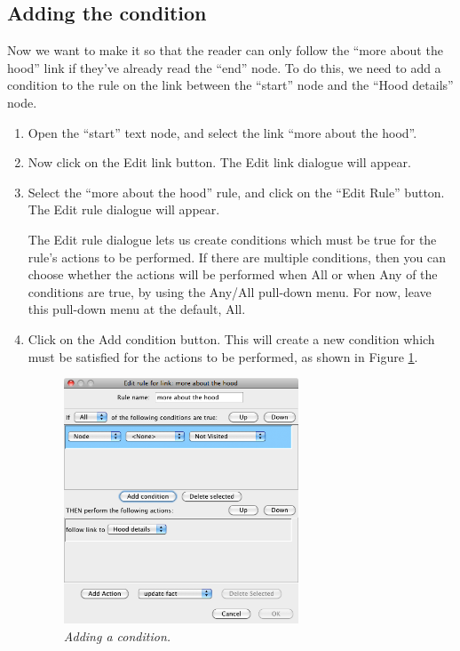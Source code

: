 \documentclass{article}
\begin{document}
\subsection{Adding the condition}

Now we want to make it so that the reader can only follow the ``more about the
hood'' link if they've already read the ``end'' node. To do this, we need to
add a condition to the rule on the link between the ``start'' node and the
``Hood details'' node.

\begin{enumerate}
  \item Open the ``start'' text node, and select the link ``more about the
  hood''.
  \item Now click on the Edit link button. The Edit link dialogue will appear.
  \item Select the ``more about the hood'' rule, and click on the ``Edit Rule''
  button. The Edit rule dialogue will appear.

The Edit rule dialogue lets us create conditions which must be true for the
rule's actions to be performed. If there are multiple conditions, then you can
choose whether the actions will be performed when All or when Any of the
conditions are true, by using the Any/All pull-down menu. For now, leave this
pull-down menu at the default, All.

\item Click on the Add condition button. This will create a new condition which
must be satisfied for the actions to be performed, as shown in Figure
\ref{fig:tut1:adding_condition}.
 
\begin{figure}[ht]
  \centering
  \includegraphics[width=7cm]{images/hypedyn-tutorial-1-figure-13}
  \caption{\textit{Adding a condition.}}
  \label{fig:tut1:adding_condition}
\end{figure} 


\end{enumerate}
\end{document}
